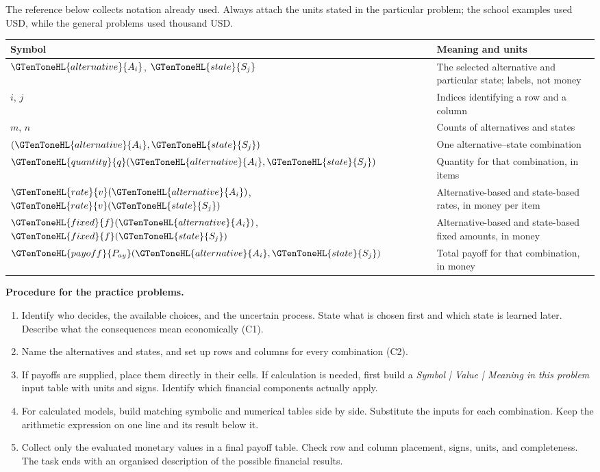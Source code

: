 The reference below collects notation already used. Always attach the units stated in the particular problem; the school examples used USD, while the general problems used thousand USD.
\begin{center}
\begin{tabularx}{\linewidth}{@{}l >{\raggedright\arraybackslash}X@{}}
\toprule Symbol & Meaning and units \\ \midrule
$\GTenToneHL{alternative}{A_i}$, $\GTenToneHL{state}{S_j}$ & The selected alternative and particular state; labels, not money \\
$i$, $j$ & Indices identifying a row and a column \\
$m$, $n$ & Counts of alternatives and states \\
$(\GTenToneHL{alternative}{A_i},\GTenToneHL{state}{S_j})$ & One alternative--state combination \\
$\GTenToneHL{quantity}{q}(\GTenToneHL{alternative}{A_i},\GTenToneHL{state}{S_j})$ & Quantity for that combination, in items \\
$\GTenToneHL{rate}{v}(\GTenToneHL{alternative}{A_i})$, $\GTenToneHL{rate}{v}(\GTenToneHL{state}{S_j})$ & Alternative-based and state-based rates, in money per item \\
$\GTenToneHL{fixed}{f}(\GTenToneHL{alternative}{A_i})$, $\GTenToneHL{fixed}{f}(\GTenToneHL{state}{S_j})$ & Alternative-based and state-based fixed amounts, in money \\
$\GTenToneHL{payoff}{P_{ay}}(\GTenToneHL{alternative}{A_i},\GTenToneHL{state}{S_j})$ & Total payoff for that combination, in money \\
\bottomrule
\end{tabularx}
\end{center}

\textbf{Procedure for the practice problems.}
\begin{enumerate}[label=\arabic*.]
\item Identify who decides, the available choices, and the uncertain process. State what is chosen first and which state is learned later. Describe what the consequences mean economically (C1).
\item Name the alternatives and states, and set up rows and columns for every combination (C2).
\item If payoffs are supplied, place them directly in their cells. If calculation is needed, first build a \emph{Symbol | Value | Meaning in this problem} input table with units and signs. Identify which financial components actually apply.
\item For calculated models, build matching symbolic and numerical tables side by side. Substitute the inputs for each combination. Keep the arithmetic expression on one line and its result below it.
\item Collect only the evaluated monetary values in a final payoff table. Check row and column placement, signs, units, and completeness. The task ends with an organised description of the possible financial results.
\end{enumerate}

